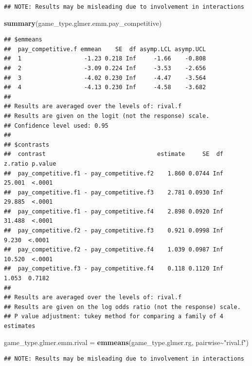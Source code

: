\documentclass[
]{article}
\newenvironment{Shaded}{\begin{snugshade}}{\end{snugshade}}
\newcommand{\FunctionTok}[1]{\textcolor[rgb]{0.13,0.29,0.53}{\textbf{#1}}}
\newcommand{\NormalTok}[1]{#1}
\newcommand{\OtherTok}[1]{\textcolor[rgb]{0.56,0.35,0.01}{#1}}
\newcommand{\SpecialCharTok}[1]{\textcolor[rgb]{0.81,0.36,0.00}{\textbf{#1}}}
\newcommand{\StringTok}[1]{\textcolor[rgb]{0.31,0.60,0.02}{#1}}
\begin{document}
\begin{verbatim}
## NOTE: Results may be misleading due to involvement in interactions
\end{verbatim}

\begin{Shaded}
\begin{Highlighting}[]
\FunctionTok{summary}\NormalTok{(game\_type.glmer.emm.pay\_competitive)}
\end{Highlighting}
\end{Shaded}

\begin{verbatim}
## $emmeans
##  pay_competitive.f emmean    SE  df asymp.LCL asymp.UCL
##  1                  -1.23 0.218 Inf     -1.66    -0.808
##  2                  -3.09 0.224 Inf     -3.53    -2.656
##  3                  -4.02 0.230 Inf     -4.47    -3.564
##  4                  -4.13 0.230 Inf     -4.58    -3.682
## 
## Results are averaged over the levels of: rival.f 
## Results are given on the logit (not the response) scale. 
## Confidence level used: 0.95 
## 
## $contrasts
##  contrast                                estimate     SE  df z.ratio p.value
##  pay_competitive.f1 - pay_competitive.f2    1.860 0.0744 Inf  25.001  <.0001
##  pay_competitive.f1 - pay_competitive.f3    2.781 0.0930 Inf  29.885  <.0001
##  pay_competitive.f1 - pay_competitive.f4    2.898 0.0920 Inf  31.488  <.0001
##  pay_competitive.f2 - pay_competitive.f3    0.921 0.0998 Inf   9.230  <.0001
##  pay_competitive.f2 - pay_competitive.f4    1.039 0.0987 Inf  10.520  <.0001
##  pay_competitive.f3 - pay_competitive.f4    0.118 0.1120 Inf   1.053  0.7182
## 
## Results are averaged over the levels of: rival.f 
## Results are given on the log odds ratio (not the response) scale. 
## P value adjustment: tukey method for comparing a family of 4 estimates
\end{verbatim}

\begin{Shaded}
\begin{Highlighting}[]
\NormalTok{game\_type.glmer.emm.rival }\OtherTok{=} \FunctionTok{emmeans}\NormalTok{(game\_type.glmer.rg, pairwise}\SpecialCharTok{\textasciitilde{}}\StringTok{"rival.f"}\NormalTok{)}
\end{Highlighting}
\end{Shaded}

\begin{verbatim}
## NOTE: Results may be misleading due to involvement in interactions
\end{verbatim}
\end{document}
